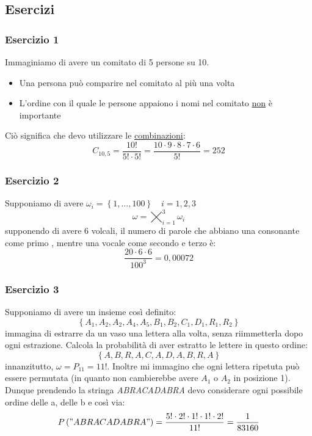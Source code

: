\subsection{Esercizi}
\subsubsection*{Esercizio 1}
Immaginiamo di avere un comitato di 5 persone su 10.
\begin{itemize}
	\item Una persona può comparire nel comitato al più una volta
	\item L'ordine con il quale le persone appaiono i nomi nel comitato \underline{non} è importante
\end{itemize}
Ciò significa che devo utilizzare le \underline{combinazioni}:
\[
	C_{10, 5} = \frac{10!}{5!\cdot 5!} = \frac{10 \cdot  9 \cdot  8 \cdot  7 \cdot  6}{5!} = 252
\]
\subsubsection*{Esercizio 2}
Supponiamo di avere $ \omega_i = \left\{1,\ldots , 100\right\} \quad i = 1,2,3  $
\[
	\omega  = \bigtimes_{i=1}^{3} \omega_i
\]
supponendo di avere $ 6 $ volcali, il numero di parole che abbiano una consonante come primo , mentre una vocale come secondo e terzo è:
\[
	\frac{20 \cdot  6 \cdot  6 }{100 ^{3} } = 0,00072
\]
\subsubsection*{Esercizio 3}
Supponiamo di avere un insieme così definito:
\[
	\left\{A_1, A_2,A_2,A_4,A_5,B_1,B_2,C_1,D_1,R_1,R_2\right\}
\]
immagina di estrarre da un vaso una lettera alla volta, senza riimmetterla dopo ogni estrazione. Calcola la probabilità di aver estratto le lettere in questo ordine:
\[
	\left\{A,B,R,A,C,A,D,A,B,R,A\right\}
\]
innanzitutto, $ \omega = P_11 = 11! $. Inoltre mi immagino che ogni lettera ripetuta può essere permutata (in quanto non cambierebbe avere $ A_1 $ o $ A_2 $ in posizione 1). Dunque prendendo la stringa \textit{ABRACADABRA} devo considerare ogni possibile ordine delle a, delle b e così via:
\[
	P\left("ABRACADABRA"\right) = \frac{5! \cdot  2! \cdot 1! \cdot 1! \cdot 2!}{11!} = \frac{1}{83160}
\]
